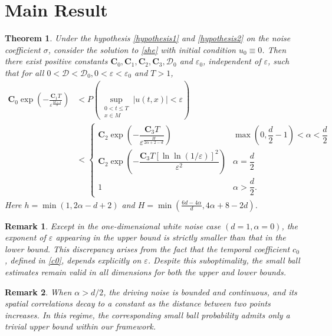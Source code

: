\documentclass[12pt]{amsart}
\newtheorem{theorem}{Theorem}[section]
\newtheorem{remark}{Remark}[section]
\numberwithin{equation}{section}
\newcommand{\1}{\mathbf{1}}
\begin{document}
\section{Main Result}
\begin{theorem}
\label{thm} 
Under the hypothesis \eqref{hypothesis1} and \eqref{hypothesis2} on the noise coefficient $\sigma$, consider the solution to \eqref{she} with initial condition $u_0\equiv 0$. Then there exist positive constants $\textbf{C}_0,\textbf{C}_1,\textbf{C}_2,\textbf{C}_3,\mathcal{D}_0$ and $\varepsilon_0$, independent of $\varepsilon$, such that for all $0<\mathcal{D}<\mathcal{D}_0,0<\varepsilon<\varepsilon_0$ and $T>1$,
                \begin{equation*}
\begin{aligned}
\mathbf{C}_0 \exp\left(-\frac{\mathbf{C}_1 T}{\varepsilon^{\frac{2d+4}{h}}}\right)
&< P\left(\sup_{\substack{0<t\le T \\ x\in M}} |u(t,x)| < \varepsilon\right) \\
&<
\begin{cases}
\mathbf{C}_2 \exp\left(-\dfrac{\mathbf{C}_3 T}{\varepsilon^{\frac{H}{2\alpha+2-d}}}\right)
& \max\left(0,\dfrac{d}{2}-1\right)<\alpha<\dfrac{d}{2} \\[0.8em]
\mathbf{C}_2 \exp\left(-\dfrac{\mathbf{C}_3 T [\ln\ln(1/\varepsilon)]^2}{\varepsilon^{2}}\right)
& \alpha=\dfrac{d}{2} \\[0.8em]
1 & \alpha>\dfrac{d}{2}.
\end{cases}
\end{aligned}
\end{equation*}
        Here $h=\min(1,2\alpha-d+2)$ and $H=\min\left(\frac{6d-4\alpha}{d},4\alpha+8-2d\right)$.
\end{theorem}

\begin{remark}
Except in the one-dimensional white noise case $(d=1,\alpha=0)$, the exponent of $\varepsilon$ appearing in the upper bound is strictly smaller than that in the lower bound. This discrepancy arises from the fact that the temporal coefficient $c_0$, defined in \eqref{c0}, depends explicitly on $\varepsilon$. Despite this suboptimality, the small ball estimates remain valid in all dimensions for both the upper and lower bounds. 
\end{remark}

\begin{remark}
    When $\alpha>d/2$, the driving noise is bounded and continuous, and its spatial correlations decay to a constant as the distance between two points increases. In this regime, the corresponding small ball probability admits only a trivial upper bound within our framework. 
\end{remark}
\end{document}
